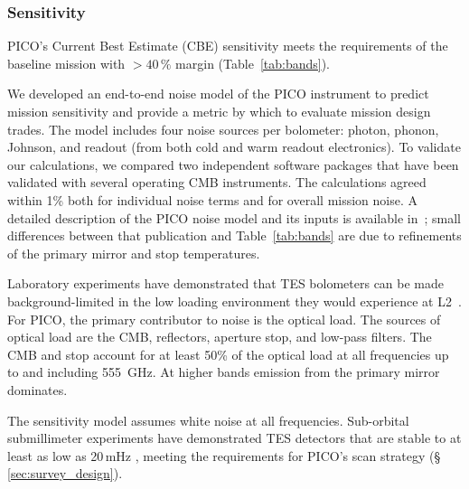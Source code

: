 

\subsubsection{Sensitivity}
\label{sec:sensitivity} %

PICO's Current Best Estimate (CBE) sensitivity meets the requirements of the baseline mission with \hbox{$>40\,\%$} margin (Table~\ref{tab:bands}).

We developed an end-to-end noise model of the PICO instrument to predict mission sensitivity and provide a metric by which to evaluate mission design trades. The model includes four noise sources per bolometer: photon, phonon, Johnson, and readout (from both cold and warm readout electronics). To validate our calculations, we compared two independent software packages that have been validated with several operating CMB instruments. The calculations agreed within 1\% both for individual noise terms and for overall mission noise. A detailed description of the PICO noise model and its inputs is available in~\citet{Young2018}; small differences between that publication and Table~\ref{tab:bands} are due to refinements of the primary mirror and stop temperatures.


Laboratory experiments have demonstrated that TES bolometers can be made background-limited in the low loading environment they would experience at L2~\citep{Beyer2012}. For PICO, the primary contributor to noise is the optical load. The sources of optical load are the CMB, reflectors, aperture stop, and low-pass filters. The CMB and stop account for at least 50\% of the optical load at all frequencies up to and including 555~GHz. At higher bands emission from the primary mirror dominates.

The sensitivity model assumes white noise at all frequencies. Sub-orbital submillimeter experiments have demonstrated TES detectors that are stable to at least as low as 20\,mHz \citep{Rahlin2014}, meeting the requirements for PICO's scan strategy (\S\,\ref{sec:survey_design}). %

